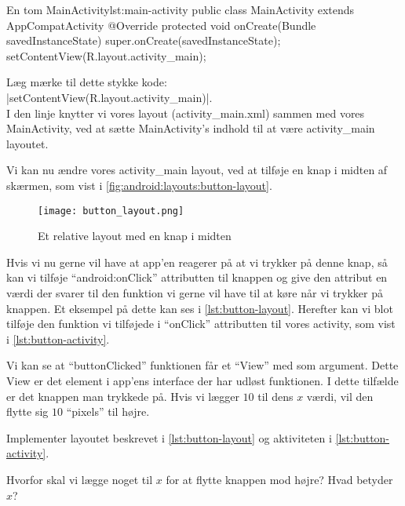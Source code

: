 \begin{JavaCode}{En tom MainActivity}{lst:main-activity}
	public class MainActivity extends AppCompatActivity {
		@Override
		protected void onCreate(Bundle savedInstanceState) {
			super.onCreate(savedInstanceState);
			setContentView(R.layout.activity_main);
		}
	}
\end{JavaCode}

\noindent
Læg mærke til dette stykke kode: \\
\JavaInline|setContentView(R.layout.activity_main)|. \\
I den linje knytter vi vores layout (activity\_main.xml) sammen med vores MainActivity, ved at sætte MainActivity's indhold til at være activity\_main layoutet.

Vi kan nu ændre vores activity\_main layout, ved at tilføje en knap i midten af skærmen, som vist i \autoref{fig:android:layouts:button-layout}.

\begin{figure}[h]
	\begin{center}
		\texttt{[image: button\_layout.png]}
		\caption{Et relative layout med en knap i midten}
		\label{fig:android:layouts:button-layout}
	\end{center}
\end{figure}

Hvis vi nu gerne vil have at app'en reagerer på at vi trykker på denne knap, så 
kan vi tilføje ``android:onClick'' attributten til knappen og give den attribut 
en værdi der svarer til den funktion vi gerne vil have til at køre når vi 
trykker på knappen. Et eksempel på dette kan ses i \autoref{lst:button-layout}.
Herefter kan vi blot tilføje den funktion vi tilføjede i ``onClick'' 
attributten til vores activity, som vist i \autoref{lst:button-activity}.

Vi kan se at ``buttonClicked'' funktionen får et ``View'' med som argument. 
Dette View er det element i app'ens \gls{interface} der har udløst funktionen. 
I dette tilfælde er det knappen man trykkede på. Hvis vi lægger $10$ til dens 
$x$ værdi, vil den flytte sig $10$ ``pixels'' til højre.

\begin{exercise}
	Implementer layoutet beskrevet i \autoref{lst:button-layout} og aktiviteten 
	i \autoref{lst:button-activity}.
\end{exercise}

\begin{exercise}
	Hvorfor skal vi lægge noget til $x$ for at flytte knappen mod højre? Hvad 
	betyder $x$?
\end{exercise}

